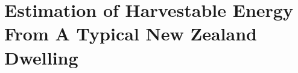 \documentclass[10pt,final,journal]{IEEEtran}
\begin{document}


    \section{Estimation of Harvestable Energy From A Typical New Zealand Dwelling}
        \label{sect:waterConsumption}

\end{document}
